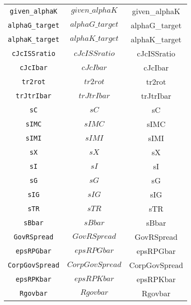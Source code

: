 \begin{center}
\begin{longtable}{ccc}
\texttt{given\_alphaK} & $given\_alphaK$ & given\_alphaK\\
\texttt{alphaG\_target} & $alphaG\_target$ & alphaG\_target\\
\texttt{alphaK\_target} & $alphaK\_target$ & alphaK\_target\\
\texttt{cJcISSratio} & $cJcISSratio$ & cJcISSratio\\
\texttt{cJcIbar} & $cJcIbar$ & cJcIbar\\
\texttt{tr2rot} & $tr2rot$ & tr2rot\\
\texttt{trJtrIbar} & $trJtrIbar$ & trJtrIbar\\
\texttt{sC} & $sC$ & sC\\
\texttt{sIMC} & $sIMC$ & sIMC\\
\texttt{sIMI} & $sIMI$ & sIMI\\
\texttt{sX} & $sX$ & sX\\
\texttt{sI} & $sI$ & sI\\
\texttt{sG} & $sG$ & sG\\
\texttt{sIG} & $sIG$ & sIG\\
\texttt{sTR} & $sTR$ & sTR\\
\texttt{sBbar} & $sBbar$ & sBbar\\
\texttt{GovRSpread} & $GovRSpread$ & GovRSpread\\
\texttt{epsRPGbar} & $epsRPGbar$ & epsRPGbar\\
\texttt{CorpGovSpread} & $CorpGovSpread$ & CorpGovSpread\\
\texttt{epsRPKbar} & $epsRPKbar$ & epsRPKbar\\
\texttt{Rgovbar} & $Rgovbar$ & Rgovbar\\
\hline%
\end{longtable}
\end{center}

